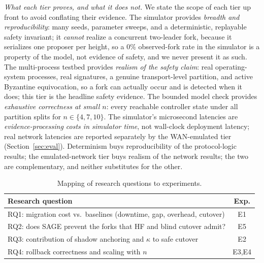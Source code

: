\documentclass[journal]{IEEEtran}
\theoremstyle{remark}
\begin{document}
\emph{What each tier proves, and what it does not.} We state the scope of each tier up front to
avoid conflating their evidence. The simulator provides \emph{breadth and reproducibility}: many
seeds, parameter sweeps, and a deterministic, replayable safety invariant; it \emph{cannot} realize
a concurrent two-leader fork, because it serializes one proposer per height, so a $0\%$ observed-fork
rate in the simulator is a property of the model, not evidence of safety, and we never present it as
such. The multi-process testbed provides \emph{realism of the safety claim}: real operating-system
processes, real signatures, a genuine transport-level partition, and active Byzantine equivocation,
so a fork can actually occur and is detected when it does; this tier is the headline safety evidence.
The bounded model check provides \emph{exhaustive correctness at small $n$}: every reachable
controller state under all partition splits for $n\in\{4,7,10\}$. The simulator's microsecond
latencies are \emph{evidence-processing costs in simulator time}, not wall-clock deployment latency;
real network latencies are reported separately by the WAN-emulated tier (Section~\ref{sec:eval}).
Determinism buys reproducibility of the protocol-logic results; the emulated-network tier buys
realism of the network results; the two are complementary, and neither substitutes for the other.

\begin{table}[t]
\centering
\caption{Mapping of research questions to experiments.}
\label{tab:rqmap}
\renewcommand{\arraystretch}{1.12}
\footnotesize
\begin{tabular}{p{}c}
\toprule
Research question & Exp. \\
\midrule
RQ1: migration cost vs.\ baselines (downtime, gap, overhead, cutover) & E1 \\
RQ2: does SAGE prevent the forks that HF and blind cutover admit? & E5 \\
RQ3: contribution of shadow anchoring and $\kappa$ to safe cutover & E2 \\
RQ4: rollback correctness and scaling with $n$ & E3,E4 \\
\bottomrule
\end{tabular}
\end{table}
\end{document}
